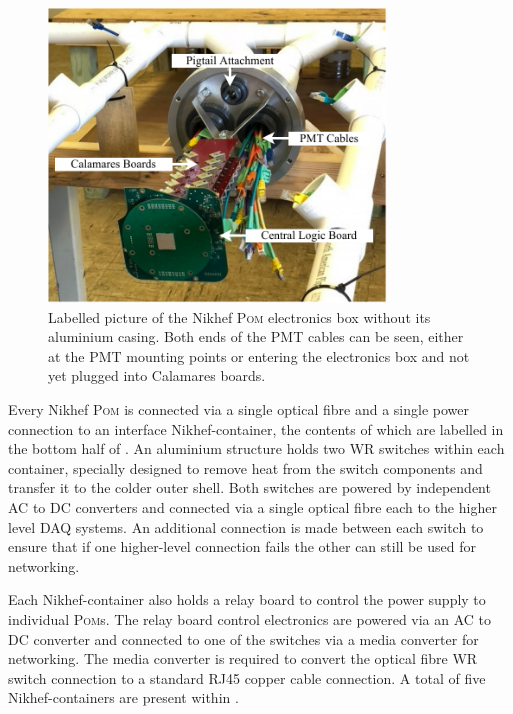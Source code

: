 \begin{figure} %
    \includegraphics[width=0.8\textwidth]{diagrams/5-daq/nikhef_plane.pdf}
    \caption[Labelled picture of the Nikhef \textsc{Pom} electronics box]
    {Labelled picture of the Nikhef \textsc{Pom} electronics box without its aluminium casing.
        Both ends of the PMT cables can be seen, either at the PMT mounting points or entering the
        electronics box and not yet plugged into Calamares boards.}
    \label{fig:nikhef_plane}
\end{figure}

Every Nikhef \textsc{Pom} is connected via a single optical fibre and a single power connection to
an interface Nikhef-container, the contents of which are labelled in the bottom half of
. An aluminium structure holds two WR switches within each container,
specially designed to remove heat from the switch components and transfer it to the colder outer
shell. Both switches are powered by independent AC to DC converters and connected via a single
optical fibre each to the higher level DAQ systems. An additional connection is made between each
switch to ensure that if one higher-level connection fails the other can still be used for
networking.

Each Nikhef-container also holds a relay board to control the power supply to individual
\textsc{Pom}s. The relay board control electronics are powered via an AC to DC converter and
connected to one of the switches via a media converter for networking. The media converter is
required to convert the optical fibre WR switch connection to a standard RJ45 copper cable
connection. A total of five Nikhef-containers are present within \chipsfive.

